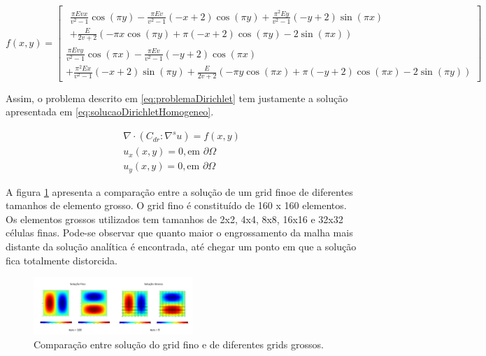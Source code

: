 \begin{equation}\label{eq:ldDiricheletHomogeneo}
f(x, y) = 
\left[\begin{matrix}
\begin{split}
\frac{\pi E v x}{v^{2} - 1} \cos{\left (\pi y \right )} - \frac{\pi E v}{v^{2} - 1} \left(- x + 2\right) \cos{\left (\pi y \right )} + \frac{\pi^{2} E y}{v^{2} - 1} \left(- y + 2\right) \sin{\left (\pi x \right )} 
\\
+
\frac{E}{2 v + 2} \left(- \pi x \cos{\left (\pi y \right )} + \pi \left(- x + 2\right) \cos{\left (\pi y \right )} - 2 \sin{\left (\pi x \right )}\right)
\end{split}
\\

\frac{\pi E v y}{v^{2} - 1} \cos{\left (\pi x \right )} - \frac{\pi E v}{v^{2} - 1} \left(- y + 2\right) \cos{\left (\pi x \right )} 
\\
+ \frac{\pi^{2} E x}{v^{2} - 1} \left(- x + 2\right) \sin{\left (\pi y \right )} + \frac{E}{2 v + 2} \left(- \pi y \cos{\left (\pi x \right )} + \pi \left(- y + 2\right) \cos{\left (\pi x \right )} - 2 \sin{\left (\pi y \right )}\right)\end{matrix}\right]
\end{equation}


Assim, o problema descrito em \ref{eq:problemaDirichlet} tem justamente a solução apresentada em \ref{eq:solucaoDirichletHomogeneo}.

\begin{equation} \label{eq:problemaDirichlet}
\begin{matrix}
\nabla \cdot  (C_{dr} : \nabla ^s u) = f(x,y)
\\ 
u_x (x, y)  =  0, \text{em } \partial \Omega
\\ 
u_y (x, y)  =  0, \text{em } \partial \Omega

\end{matrix}
\end{equation}

A figura \ref{fig:DirichletHomogeneo} apresenta a comparação entre a solução de um grid finoe de diferentes tamanhos de elemento grosso. 
O grid fino é constituído de 160 x 160 elementos. Os elementos grossos utilizados tem tamanhos de  2x2, 4x4, 8x8, 16x16 e 32x32 células finas. 
Pode-se observar que quanto maior o engrossamento da malha mais distante da solução analítica é encontrada, até chegar um ponto em que a solução
fica totalmente distorcida. 

\begin{figure}[!htbp]
\label{fig:DirichletHomogeneo}
\centering
\includegraphics[width=6cm]{chap08/figs/DirichletHomogeneoTemp.png}
\caption{Comparação entre solução do grid fino e de diferentes grids grossos.}
\end{figure}


